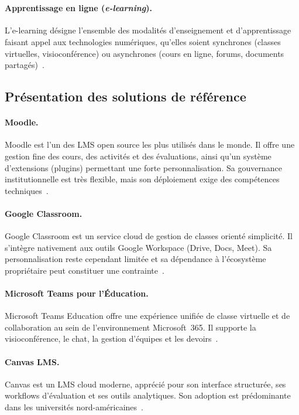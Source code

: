 ﻿﻿\documentclass[12pt,a4paper,oneside]{report}
\begin{document}
\paragraph{Apprentissage en ligne (\textit{e-learning}).}
L'e-learning d\'esigne l'ensemble des modalit\'es d'enseignement et d'apprentissage faisant appel aux technologies num\'eriques, qu'elles soient synchrones (classes virtuelles, visioconf\'erence) ou asynchrones (cours en ligne, forums, documents partag\'es)~\cite{unesco_digital_2026}.

\subsection{Pr\'esentation des solutions de r\'ef\'erence}

\paragraph{Moodle.}
Moodle est l'un des LMS open source les plus utilis\'es dans le monde. Il offre une gestion fine des cours, des activit\'es et des \'evaluations, ainsi qu'un syst\`eme d'extensions (plugins) permettant une forte personnalisation. Sa gouvernance institutionnelle est tr\`es flexible, mais son d\'eploiement exige des comp\'etences techniques~\cite{moodle_overview_2026}.

\paragraph{Google Classroom.}
Google Classroom est un service cloud de gestion de classes orient\'e simplicit\'e. Il s'int\`egre nativement aux outils Google Workspace (Drive, Docs, Meet). Sa personnalisation reste cependant limit\'ee et sa d\'ependance \`a l'\'ecosyst\`eme propri\'etaire peut constituer une contrainte~\cite{google_classroom_2026}.

\paragraph{Microsoft Teams pour l'\'Education.}
Microsoft Teams Education offre une exp\'erience unifi\'ee de classe virtuelle et de collaboration au sein de l'environnement Microsoft~365. Il supporte la visioconf\'erence, le chat, la gestion d'\'equipes et les devoirs~\cite{microsoft_teams_edu_2026}.

\paragraph{Canvas LMS.}
Canvas est un LMS cloud moderne, appr\'eci\'e pour son interface structur\'ee, ses workflows d'\'evaluation et ses outils analytiques. Son adoption est pr\'edominante dans les universit\'es nord-am\'ericaines~\cite{canvas_overview_2026}.
\end{document}
